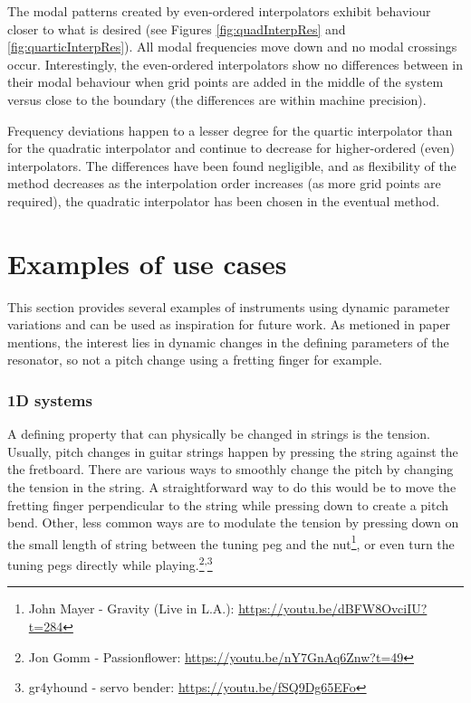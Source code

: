 The modal patterns created by even-ordered interpolators exhibit behaviour closer to what is desired (see Figures \ref{fig:quadInterpRes} and \ref{fig:quarticInterpRes}). All modal frequencies move down and no modal crossings occur. Interestingly, the even-ordered interpolators show no differences between in their modal behaviour when grid points are added in the middle of the system versus close to the boundary (the differences are within machine precision).

Frequency deviations happen to a lesser degree for the quartic interpolator than for the quadratic interpolator and continue to decrease for higher-ordered (even) interpolators. The differences have been found negligible, and as flexibility of the method decreases as the interpolation order increases (as more grid points are required), the quadratic interpolator has been chosen in the eventual method. 


\section{Examples of use cases}\label{sec:examples}
This section provides several examples of instruments using dynamic parameter variations and can be used as inspiration for future work. As metioned in paper \citeP[G] mentions, the interest lies in dynamic changes in the defining parameters of the resonator, so not a pitch change using a fretting finger for example. 


\subsubsection{1D systems}
A defining property that can physically be changed in strings is the tension. Usually, pitch changes in guitar strings happen by pressing the string against the the fretboard. There are various ways to smoothly change the pitch by changing the tension in the string. A straightforward way to do this would be to move the fretting finger perpendicular to the string while pressing down to create a pitch bend. Other, less common ways are to modulate the tension by pressing down on the small length of string between the tuning peg and the nut\footnote{John Mayer - Gravity (Live in L.A.): \url{https://youtu.be/dBFW8OvciIU?t=284}}, or even turn the tuning pegs directly while playing.\footnote{Jon Gomm - Passionflower: \url{https://youtu.be/nY7GnAq6Znw?t=49}}\textsuperscript{,}\footnote{gr4yhound - servo bender: \url{https://youtu.be/fSQ9Dg65EFo}}

